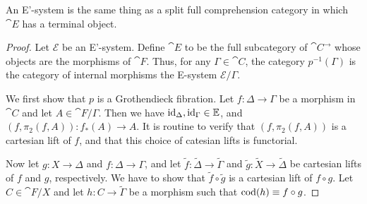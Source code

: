 \begin{conj}
An E'-system is the same thing as a split full comprehension category in which
$\cat{E}$ has a terminal object.
\end{conj}

\begin{proof}
Let $\mathcal{E}$ be an E'-system. Define $\cat{E}$ to be the full subcategory
of $\cat{C}^\to$ whose objects are the morphisms of $\cat{F}$. Thus, for any
$\Gamma\in\cat{C}$, the category $p^{-1}(\Gamma)$ is the category of internal
morphisms the E-system $\mathcal{E}/\Gamma$. 

We first show that $p$ is a Grothendieck fibration. Let $f:\Delta\to\Gamma$ be
a morphism in $\cat{C}$ and let $A\in\cat{F}/\Gamma$. Then we have ${\mathrm{id}_{\Delta}},{\mathrm{id}_{\Gamma}}\in\mathbb{E}$,
and $(f,\pi_2(f,A)):f_\ast(A)\to A$. It is routine to verify that $(f,\pi_2(f,A))$
is a cartesian lift of $f$, and that this choice of catesian lifts is functorial. 

Now let $g:X\to\Delta$ and $f:\Delta\to \Gamma$, and let $\tilde{f}:\tilde{\Delta}\to\tilde{\Gamma}$ and
$\tilde{g}:\tilde{X}\to\tilde{\Delta}$ be cartesian lifts of $f$ and $g$, respectively. We have to show
that $\tilde{f}\circ \tilde{g}$ is a cartesian lift of $f\circ g$. Let $C\in\cat{F}/X$ and
let $h : C\to \tilde{\Gamma}$ be a morphism such that $\mathrm{cod}(h)\equiv f\circ g$. 
\end{proof}

\begin{comment}
\subsection{Quotients of E-systems}

\begin{defn}
A regular congruence relation $\sim$ on a category $\cat{F}$ with term structure,
is a triple $(\sim_c,\sim_f,\sim_t)$ consisting of
\begin{enumerate}
\item an equivalence relation $\sim_c$ on the set of objects of $\cat{F}$,
\item an equivalence relation $\sim_f$ on the set of morphisms of $\cat{F}$,
\item an equivalence relation $\sim_t$ on the set of terms of $\cat{F}$,
\end{enumerate}
which are compatible with $\mathrm{cod}$, $\mathrm{dom}$, $\catid{}$, $\circ$
and $\ebd$
\end{defn}
\end{comment}
